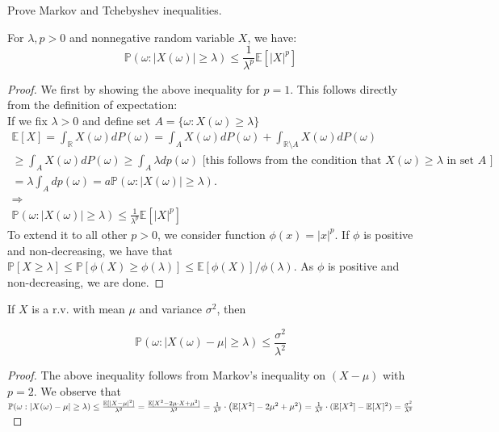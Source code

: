 \documentclass[12pt,twoside, letter]{exam}
\theoremstyle{definition}
\newcommand{\rr}{\mathbb{R}}
\newcommand{\ee}{\mathbb{E}}
\newcommand{\pp}{\mathbb{P}}
\begin{document}
\begin{enumerate}
\begin{solution}
    \end{solution}
\end{enumerate}

 Prove Markov and Tchebyshev inequalities.

\begin{solution}
    For $\lambda, p > 0$ and nonnegative random variable $X$, we have:
    \begin{equation*}
      \pp(\omega: |X(\omega)| \geq \lambda) \leq \frac{1}{\lambda^p} \ee[|X|^{p}]
    \end{equation*}

    \begin{proof}
      We first by showing the above inequality for $p = 1$. This follows directly from the definition of expectation: \\
      If we fix $\lambda > 0$ and define set $A = \{\omega : X(\omega) \geq \lambda \}$
      \begin{multline*}
        \ee[X] = \int_{\rr} X(\omega) dP(\omega) = \int_{A} X(\omega) dP(\omega) + \int_{\rr \setminus A} X(\omega) dP(\omega)
        \\
        \geq \int_{A} X(\omega) dP(\omega) \geq \int_{A} \lambda dp(\omega) \text{ [this follows from the condition that $X(\omega) \geq \lambda$ in set $A$ ]} \\
        = \lambda \int_{A} dp(\omega) = a \pp(\omega: |X(\omega)| \geq \lambda). \\
        \Rightarrow \\
        \pp(\omega: |X(\omega)| \geq \lambda) \leq \frac{1}{\lambda^p} \ee[|X|^{p}]
      \end{multline*}
      To extend it to all other $p > 0$, we consider function $\phi(x) = |x|^p$.
      If $\phi$ is positive and non-decreasing, we have that $\pp[X \geq \lambda]
      \leq \pp[\phi(X) \geq \phi(\lambda)] \leq \ee[\phi(X)]/\phi(\lambda).$ As $\phi$ is positive and non-decreasing, we are done.
    \end{proof}

    If $X$ is a r.v. with mean $\mu$ and variance $\sigma^2$, then

    \begin{equation*}
      \pp(\omega: |X(\omega) - \mu| \geq \lambda) \leq \frac{\sigma^2}{\lambda^2}
    \end{equation*}

    \begin{proof}
      The above inequality follows from Markov's inequality on $(X-\mu)$ with $p = 2$. We observe that
      $\pp(\omega: |X(\omega) - \mu| \geq \lambda) \leq \frac{\ee[|X - \mu|^2]}{\lambda^2}
      = \frac{\ee[X^2 - 2\mu\cdot X + \mu^2]}{\lambda^2} \\
      = \frac{1}{\lambda^{2}}\cdot \big( \ee[X^2] - 2\mu^{2} + \mu^2 \big)
      = \frac{1}{\lambda^{2}} \cdot (\ee[X^2] - \ee[X]^2) = \frac{\sigma^2}{\lambda^2}$
    \end{proof}
  \end{solution}
\end{document}
